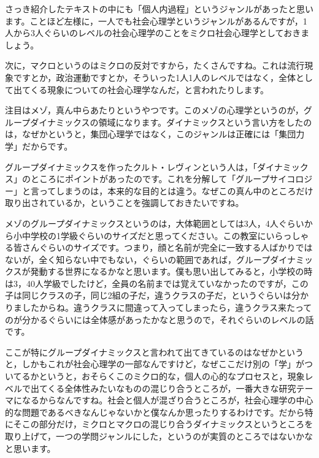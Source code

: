\documentclass{ltjsbook}
\begin{document}
さっき紹介したテキスト\parencite{SPgairon2016,}の中にも「個人内過程」というジャンルがあったと思います。ことほど左様に，一人でも社会心理学というジャンルがあるんですが，1人から3人ぐらいのレベルの社会心理学のことをミクロ社会心理学としておきましょう。

次に，マクロというのはミクロの反対ですから，たくさんですね。これは流行現象ですとか，政治運動ですとか，そういった1人1人のレベルではなく，全体として出てくる現象についての社会心理学なんだ，と言われたりします。

注目はメゾ，真ん中らあたりというやつです。このメゾの心理学というのが，グループダイナミックスの領域になります。ダイナミックスという言い方をしたのは，なぜかというと，集団心理学ではなく，このジャンルは正確には「集団力学」だからです。

グループダイナミックスを作ったクルト・レヴィンという人は，「ダイナミックス」のところにポイントがあったのです。これを分解して「グループサイコロジー」と言ってしまうのは，本来的な目的とは違う。なぜこの真ん中のところだけ取り出されているか，ということを強調しておきたいですね。

メゾのグループダイナミックスというのは，大体範囲としては3人，4人ぐらいから小中学校の1学級ぐらいのサイズだと思ってください。この教室にいらっしゃる皆さんぐらいのサイズです。つまり，顔と名前が完全に一致する人ばかりではないが，全く知らない中でもない，ぐらいの範囲であれば，グループダイナミックスが発動する世界になるかなと思います。僕も思い出してみると，小学校の時は3，40人学級でしたけど，全員の名前までは覚えていなかったのですが，この子は同じクラスの子，同じ2組の子だ，違うクラスの子だ，というぐらいは分かりましたからね。違うクラスに間違って入ってしまったら，違うクラス来たってのが分かるぐらいには全体感があったかなと思うので，それぐらいのレベルの話です。

ここが特にグループダイナミックスと言われて出てきているのはなぜかというと，しかもこれが社会心理学の一部なんですけど，なぜここだけ別の「学」がついてるかというと，おそらくこのミクロ的な，個人の心的なプロセスと，現象レベルで出てくる全体性みたいなものの混じり合うところが，一番大きな研究テーマになるからなんですね。社会と個人が混ざり合うところが，社会心理学の中心的な問題であるべきなんじゃないかと僕なんか思ったりするわけです。だから特にそこの部分だけ，ミクロとマクロの混じり合うダイナミックスというところを取り上げて，一つの学問ジャンルにした，というのが実質のところではないかなと思います。
\end{document}
